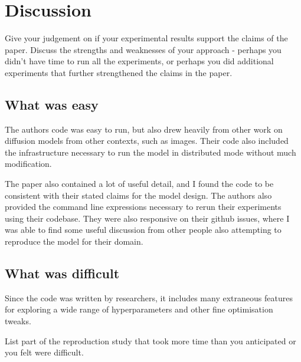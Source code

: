 \section{Discussion}

Give your judgement on if your experimental results support the claims of the paper. Discuss the strengths and weaknesses of your approach - perhaps you didn't have time to run all the experiments, or perhaps you did additional experiments that further strengthened the claims in the paper.

\subsection{What was easy}


The authors code was easy to run, but also drew heavily from other work on diffusion models from other contexts, such as images. Their code also included the infrastructure necessary to run the model in distributed mode without much modification.

The paper also contained a lot of useful detail, and I found the code to be consistent with their stated claims for the model design. The authors also provided the command line expressions necessary to rerun their experiments using their codebase. They were also responsive on their github issues, where I was able to find some useful discussion from other people also attempting to reproduce the model for their domain.

\subsection{What was difficult}

Since the code was written by researchers, it includes many extraneous features for exploring a wide range of hyperparameters and other fine optimisation tweaks.

List part of the reproduction study that took more time than you anticipated or you felt were difficult.

